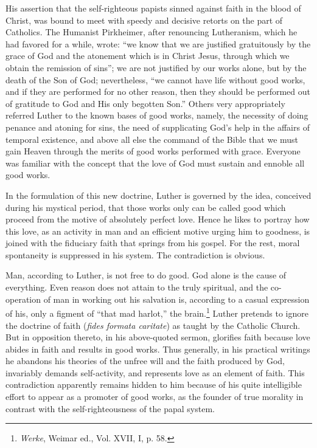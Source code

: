 His assertion that the self-righteous papists sinned against faith in
the blood of Christ, was bound to meet with speedy and decisive retorts
on the part of Catholics. The Humanist Pirkheimer, after renouncing
Lutheranism, which he had favored for a while, wrote: “we know that we
are justified gratuitously by the grace of God and the atonement which is
in Christ Jesus, through which we obtain the remission of sins”; we are
not justified by our works alone, but by the death of the Son of God;
nevertheless, “we cannot have life without good works, and if they are
performed for no other reason, then they should be performed out of gratitude
to God and His only begotten Son.” Others very appropriately referred
Luther to the known bases of good works, namely, the necessity of doing
penance and atoning for sins, the need of supplicating God’s help in the
affairs of temporal existence, and above all else the command of the Bible
that we must gain Heaven through the merits of good works performed
with grace. Everyone was familiar with the concept that the love of God
must sustain and ennoble all good works.

In the formulation of this new doctrine, Luther is governed by the
idea, conceived during his mystical period, that those works only can
be called good which proceed from the motive of absolutely perfect
love. Hence he likes to portray how this love, as an activity in man
and an efficient motive urging him to goodness, is joined with the
fiduciary faith that springs from his gospel. For the rest, moral spontaneity
is suppressed in his system. The contradiction is obvious.

Man, according to Luther, is not free to do good. God alone is the cause
of everything. Even reason does not attain to the truly spiritual, and the
co-operation of man in working out his salvation is, according to a casual expression
of his, only a figment of ``that mad harlot,'' the brain.\footnote
{\textit{Werke}, Weimar ed., Vol. XVII, I, p. 58.}
Luther pretends to ignore the doctrine of faith (\textit{fides formata caritate})
as taught by the Catholic Church. But in opposition thereto, in his above-quoted
sermon, glorifies faith because love abides in faith and results
in good works. Thus generally, in his practical writings he abandons his
theories of the unfree will and the faith produced by God, invariably
demands self-activity, and represents love as an element of faith. This contradiction apparently remains hidden to him because of his quite intelligible
effort to appear as a promoter of good works, as the founder of true morality in contrast with the self-righteousness of the papal system.

